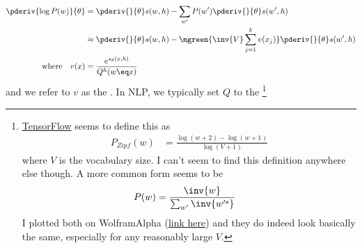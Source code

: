 \documentclass[11pt]{article}
\begin{document}
\begin{align}
\pderiv{\log P(w)}{\theta}
&= \pderiv{}{\theta} s(w, h) - \sum_{w'} P(w') \pderiv{}{\theta} s(w', h) \\
&\approx  \pderiv{}{\theta} s(w, h) - \mgreen{ \inv{V} \sum_{j=1}^{k} v(x_j) }  \pderiv{}{\theta} s(w', h) \\
\text{where} 
\quad 
v(x)
&= \frac{ e^{s_{\theta}(x, h)}    }{Q^h(w \eq x)} 
\end{align} 
and we refer to $v$ as the . In NLP, we typically set $Q$ to the \footnote{\href{https://www.tensorflow.org/api_docs/python/tf/random/log_uniform_candidate_sampler}{TensorFlow} seems to define this as
	\begin{align}
	P_{Zipf}(w) &= \frac{  \log(w + 2) - \log(w + 1) }{   \log(V + 1)   }
	\end{align}
	where $V$ is the vocabulary size. I can't seem to find this definition anywhere else though. A more common form seems to be
	\begin{align}
	P(w) &= \frac{ \inv{w} }{  \sum_{w'} \inv{ w'^{s} } }
	\end{align}
	I plotted both on WolframAlpha (\href{https://www.wolframalpha.com/input/?i=plot+\%281\%2Fx+\%2F+5.187377517639620260805117675658253\%29+and+\%28log\%28x\%2B2\%29+-+log\%28x\%2B1\%29\%29+\%2F+log\%28100+\%2B+1\%29+for+x\%3D1+to+100}{link here}) and they do indeed look basically the same, especially for any reasonably large $V$. 
}
\end{document}
